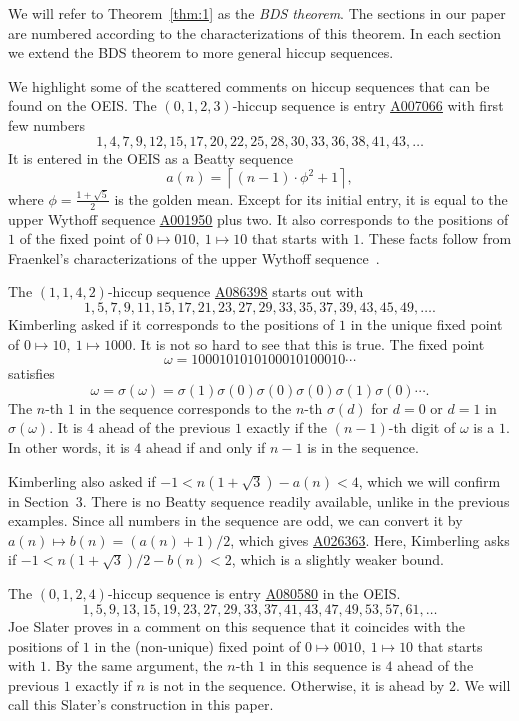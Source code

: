 \documentclass[12pt,reqno]{article}
\newcommand{\seqnum}[1]{\href{https://oeis.org/#1}{\rm \underline{#1}}}
\begin{document}
We will refer to Theorem~\ref{thm:1} as the\textit{ BDS theorem}. The sections in our
paper are numbered according to the characterizations of this theorem. In each
section we extend the BDS theorem to more general hiccup sequences.
\medbreak


We highlight some of the scattered comments on hiccup sequences that can be found on the OEIS.
The $(0,1,2,3)$-hiccup sequence is entry \seqnum{A007066} with first few numbers
\[
1, 4, 7, 9, 12, 15, 17, 20, 22, 25, 28, 30, 33, 36, 38, 41, 43,\ldots
\]
It is entered in the OEIS as a Beatty sequence
\[
a(n)=\left\lceil (n-1)\cdot\phi^2 + 1\right\rceil,
\]
where $\phi=\frac{1+\sqrt{5}}2$ is the golden mean. 
Except for its initial entry, 
it is equal to the upper Wythoff sequence \seqnum{A001950} plus two.
It also corresponds to the positions of $1$ of the fixed
point of $0\mapsto 010,\ 1\mapsto 10$ that starts with $1$.
These facts follow from Fraenkel's characterizations
of the upper Wythoff sequence~\cite{fraenkel1982}.

The $(1,1,4,2)$-hiccup sequence \seqnum{A086398} starts out with
\[
1, 5, 7, 9, 11, 15, 17, 21, 23, 27, 29, 33, 35, 37, 39, 43, 45, 49,\ldots.
\]
Kimberling asked if it corresponds to the positions of $1$ in the
unique fixed point of $0\mapsto 10,\ 1\mapsto 1000$. It is not so hard to
see that this is true. The fixed point 
\[\omega=1000101010100010100010\cdots\]
satisfies
\[\omega=\sigma(\omega)=\sigma(1)\sigma(0)\sigma(0)\sigma(0)\sigma(1)\sigma(0)\cdots.\]
The $n$-th $1$ in the sequence corresponds to the $n$-th $\sigma(d)$ for $d=0$ or $d=1$
in $\sigma(\omega)$. It is $4$ ahead of the previous $1$ exactly if the $(n-1)$-th
digit of $\omega$ is a $1$. In other words, it is $4$ ahead if and only if $n-1$ is in
the sequence. 

Kimberling also asked if $-1 < n\left(1 + \sqrt{3}\right) - a(n) < 4$, which we will
confirm in Section~3. There is no
Beatty sequence readily available, unlike in the previous examples.
Since all numbers
in the sequence are odd, we can convert it by $a(n)\mapsto b(n)=(a(n)+1)/2$, which gives \seqnum{A026363}.
Here, Kimberling asks if $-1 < n\left(1+\sqrt{3}\right)/2 - b(n) < 2$, which is a slightly
weaker bound.

The $(0,1,2,4)$-hiccup sequence is entry \seqnum{A080580} in the OEIS.
\[
1, 5, 9, 13, 15, 19, 23, 27, 29, 33, 37, 41, 43, 47, 49,  53, 57, 61,\ldots
\]
Joe Slater proves in a comment on this sequence that it coincides with the positions of $1$ in the 
(non-unique) fixed
point of $0\mapsto 0010,\ 1\mapsto 10$ that starts with $1$. By the same argument, the $n$-th $1$ in this
sequence is $4$ ahead of the previous $1$ exactly if $n$ is not in the sequence. Otherwise,
it is ahead by $2$. We will call this Slater's construction in this paper. 
\end{document}
